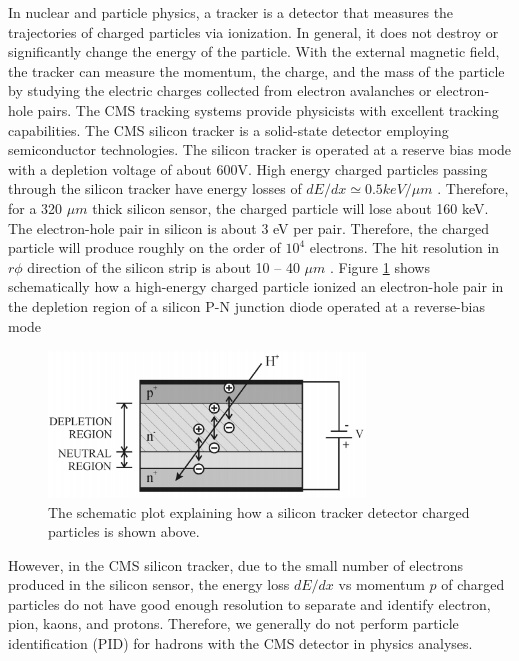 In nuclear and particle physics, a tracker is a detector that measures the trajectories of charged particles via ionization. In general, it does not destroy or significantly change the energy of the particle. With the external magnetic field, the tracker can measure the momentum, the charge, and the mass of the particle by studying the electric charges collected from electron avalanches or electron-hole pairs. The CMS tracking systems provide physicists with excellent tracking capabilities. The CMS silicon tracker is a solid-state detector employing semiconductor technologies. The silicon tracker is operated at a reserve bias mode with a depletion voltage of about 600V. High energy charged particles passing through the silicon tracker have energy losses of $dE/dx \simeq 0.5 keV/\mu m$ \cite{AlphaTheoEx}. Therefore, for a 320 $\mu m$ thick silicon sensor, the charged particle will lose about 160 keV. The electron-hole pair in silicon is about 3 eV per pair. Therefore, the charged particle will produce roughly on the order of $10^4$ electrons. The hit resolution in $r\phi$ direction of the silicon strip is about 10 -- 40 $\mu m$ \cite{CMSTrackComp}. Figure \ref{SiliconDetector} shows schematically how a high-energy charged particle ionized an electron-hole pair in the depletion region of a silicon P-N junction diode operated at a reverse-bias mode


\begin{figure}[hbtp]
\begin{center}
\includegraphics[width=0.75\textwidth]{Figures/Chapter3/SiliconDetector.png}
\caption{The schematic plot explaining how a silicon tracker detector charged particles is shown above.}
\label{SiliconDetector}
\end{center}
\end{figure} 

However, in the CMS silicon tracker, due to the small number of electrons produced in the silicon sensor, the energy loss $dE/dx$ vs momentum $p$ of charged particles do not have good enough resolution to separate and identify electron, pion, kaons, and protons. Therefore, we generally do not perform particle identification (PID) for hadrons with the CMS detector in physics analyses.  

